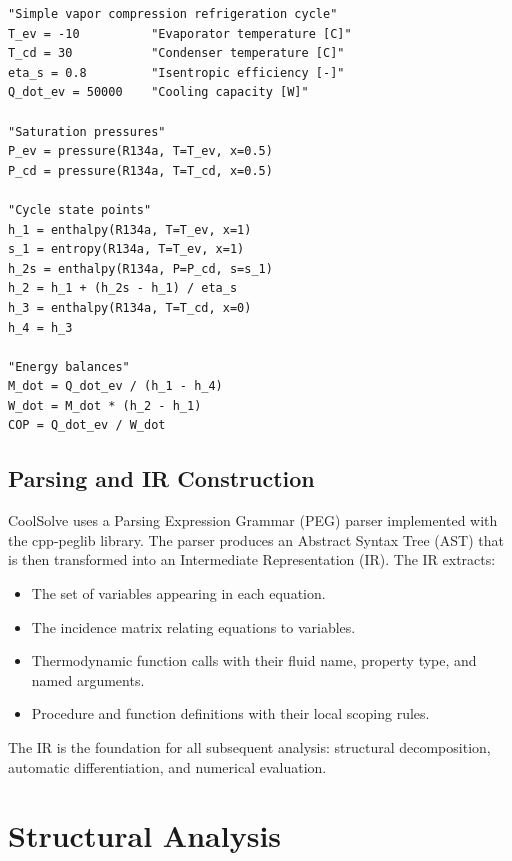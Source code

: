 \documentclass[review,3p]{elsarticle}
\begin{document}
\begin{lstlisting}[caption={Simple refrigeration cycle model in the EES-compatible language.},label={lst:example},float=tp]
"Simple vapor compression refrigeration cycle"
T_ev = -10          "Evaporator temperature [C]"
T_cd = 30           "Condenser temperature [C]"
eta_s = 0.8         "Isentropic efficiency [-]"
Q_dot_ev = 50000    "Cooling capacity [W]"

"Saturation pressures"
P_ev = pressure(R134a, T=T_ev, x=0.5)
P_cd = pressure(R134a, T=T_cd, x=0.5)

"Cycle state points"
h_1 = enthalpy(R134a, T=T_ev, x=1)
s_1 = entropy(R134a, T=T_ev, x=1)
h_2s = enthalpy(R134a, P=P_cd, s=s_1)
h_2 = h_1 + (h_2s - h_1) / eta_s
h_3 = enthalpy(R134a, T=T_cd, x=0)
h_4 = h_3

"Energy balances"
M_dot = Q_dot_ev / (h_1 - h_4)
W_dot = M_dot * (h_2 - h_1)
COP = Q_dot_ev / W_dot
\end{lstlisting}

\subsection{Parsing and IR Construction}

CoolSolve uses a Parsing Expression Grammar (PEG) parser implemented with the cpp-peglib library. The parser produces an Abstract Syntax Tree (AST) that is then transformed into an Intermediate Representation (IR). The IR extracts:
\begin{itemize}
    \item The set of variables appearing in each equation.
    \item The incidence matrix relating equations to variables.
    \item Thermodynamic function calls with their fluid name, property type, and named arguments.
    \item Procedure and function definitions with their local scoping rules.
\end{itemize}

The IR is the foundation for all subsequent analysis: structural decomposition, automatic differentiation, and numerical evaluation.

\section{Structural Analysis}
\label{sec:structural}
\end{document}
